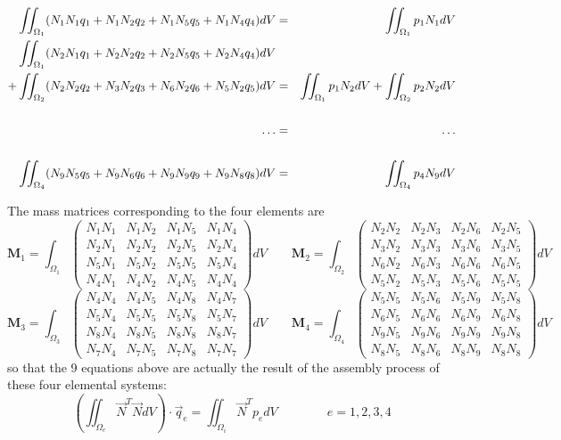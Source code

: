 \begin{eqnarray}
 \iint_{\Omega_1} (N_1N_1 q_1 + N_1N_2 q_2 + N_1N_5q_5 + N_1N_4q_4) dV &=& \iint_{\Omega_1} p_1 N_1 dV \nonumber\\
 \iint_{\Omega_1} (N_2 N_1  q_1 + N_2 N_2q_2 + N_2 N_5q_5 + N_2 N_4q_4)  dV \nonumber\\
+\iint_{\Omega_2} (N_2 N_2 q_2 + N_3 N_2 q_3 + N_6 N_2 q_6 + N_5 N_2 q_5) dV 
&=& \iint_{\Omega_1} p_1N_2 dV + \iint_{\Omega_2}  p_2 N_2 dV \nonumber\\
\nonumber\\
\dots &=& \dots \nonumber\\
\nonumber\\
 \iint_{\Omega_4} (N_9N_5 q_5 + N_9N_6q_6 + N_9N_9q_9 + N_9N_8q_8) dV &=&  \iint_{\Omega_4} p_4 N_9 dV 
\end{eqnarray}

The mass matrices corresponding to the four elements are 
\[
{\bm M}_1 = \int_{\Omega_1} \left( \begin{array}{cccc}
N_1 N_1 & N_1 N_2 & N_1 N_5 & N_1 N_4 \\
N_2 N_1 & N_2 N_2 & N_2 N_5 & N_2 N_4 \\
N_5 N_1 & N_5 N_2 & N_5 N_5 & N_5 N_4 \\
N_4 N_1 & N_4 N_2 & N_4 N_5 & N_4 N_4 
\end{array}\right) dV
\qquad
{\bm M}_2 = \int_{\Omega_2} \left( \begin{array}{cccc}
N_2 N_2 & N_2 N_3 & N_2 N_6 & N_2 N_5 \\
N_3 N_2 & N_3 N_3 & N_3 N_6 & N_3 N_5 \\
N_6 N_2 & N_6 N_3 & N_6 N_6 & N_6 N_5 \\
N_5 N_2 & N_5 N_3 & N_5 N_6 & N_5 N_5 
\end{array}\right) dV
\]
\[
{\bm M}_3 = \int_{\Omega_3} \left( \begin{array}{cccc}
N_4 N_4 & N_4 N_5 & N_4 N_8 & N_4 N_7 \\
N_5 N_4 & N_5 N_5 & N_5 N_8 & N_5 N_7 \\
N_8 N_4 & N_8 N_5 & N_8 N_8 & N_8 N_7 \\
N_7 N_4 & N_7 N_5 & N_7 N_8 & N_7 N_7 
\end{array}\right) dV
\qquad
{\bm M}_4 = \int_{\Omega_4} \left( \begin{array}{cccc}
N_5 N_5 & N_5 N_6 & N_5 N_9 & N_5 N_8 \\
N_6 N_5 & N_6 N_6 & N_6 N_9 & N_6 N_8 \\
N_9 N_5 & N_9 N_6 & N_9 N_9 & N_9 N_8 \\
N_8 N_5 & N_8 N_6 & N_8 N_9 & N_8 N_8 
\end{array}\right) dV
\]
so that the 9 equations above are actually the result of the assembly process of these four 
elemental systems:
\[
\left( \iint_{\Omega_e} \vec{N}^T\vec{N} dV \right) \cdot \vec{q}_e = \iint_{\Omega_i} \vec{N}^T p_e dV 
\qquad\qquad e=1,2,3,4
\]


